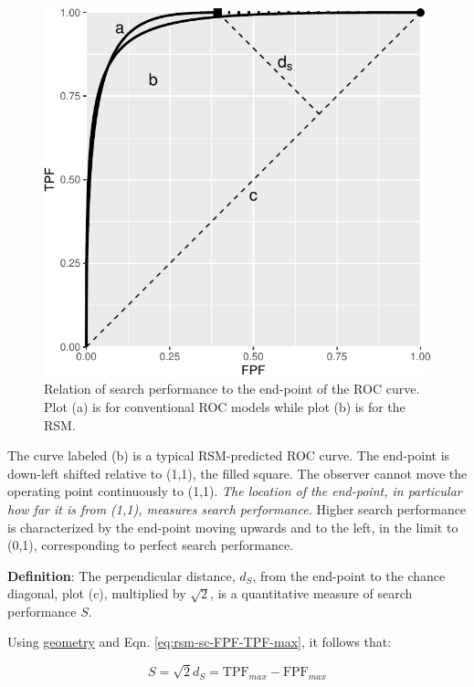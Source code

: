 \documentclass[
]{book}
\begin{document}
\begin{figure}
\centering
\includegraphics{08-rsm-search_files/figure-latex/rsm-sc-performance-from-roc-curve-1.pdf}
\caption{\label{fig:rsm-sc-performance-from-roc-curve}Relation of search performance to the end-point of the ROC curve. Plot (a) is for conventional ROC models while plot (b) is for the RSM.}
\end{figure}

The curve labeled (b) is a typical RSM-predicted ROC curve. The end-point is down-left shifted relative to (1,1), the filled square. The observer cannot move the operating point continuously to (1,1). \emph{The location of the end-point, in particular how far it is from (1,1), measures search performance.} Higher search performance is characterized by the end-point moving upwards and to the left, in the limit to (0,1), corresponding to perfect search performance.

\textbf{Definition}: The perpendicular distance, \(d_S\), from the end-point to the chance diagonal, plot (c), multiplied by \(\sqrt{2}\), is a quantitative measure of search performance \(S\).

Using \href{https://en.wikipedia.org/wiki/Distance_from_a_point_to_a_line\#Line_defined_by_an_equation}{geometry} and Eqn. \eqref{eq:rsm-sc-FPF-TPF-max}, it follows that:

\begin{equation} 
S=\sqrt{2}d_S=\text{TPF}_{max}-\text{FPF}_{max}
\label{eq:rsm-sc-perp-distance}
\end{equation}
\end{document}
